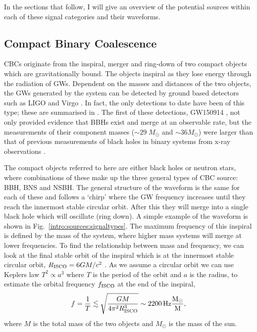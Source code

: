In the sections that follow, I will give an overview of the potential sources
within each of these signal categories and their waveforms.


\subsection{\label{intro:sources:cbc}Compact Binary Coalescence}

\glspl{CBC} originate from the inspiral, merger and ring-down of two compact
objects which are gravitationally bound.  The objects inspiral as they lose
energy through the radiation of \glspl{GW}.  Dependent on the masses
and distances of the two objects, the \glspl{GW} generated by the
system can be detected by ground based detectors such as \gls{LIGO}
\citep{aasi2015AdvancedLIGO} and Virgo \citep{acernese2015AdvancedVirgo}.  In
fact, the only detections to date have been of this type; these are summarised
in
\citep{ligoscientificcollaborationandvirgocollaboration2019GWTC1GravitationalWave}.
The first of these detections, GW150914
\citep{abbott2016ObservationGravitational}, not only provided evidence that
\glspl{BBH} exist and merge at an observable rate, but the measurements of
their component masses ($\sim 29\; M_{\odot}$ and $\sim 36 M_{\odot}$) were
larger than that of previous measurements of black holes in binary systems from
x-ray observations \citep{abbott2016ASTROPHYSICALIMPLICATIONS}. 

The compact objects referred to here are either black holes or neutron stars,
where combinations of these make up the three general types of \gls{CBC}
source: \gls{BBH}, \gls{BNS} and \gls{NSBH}.  The general structure of the
waveform is the same for each of these and follows a `chirp' where the \gls{GW}
frequency increases until they reach the innermost stable circular orbit.
After this they will merge into a single black hole which will oscillate (ring down). A simple example of the waveform is shown in
Fig.~\ref{intro:sources:signaltypes}.  The maximum frequency of this inspiral
is defined by the mass of the system, where higher mass systems will merge at
lower frequencies.  To find the relationship between mass and frequency, we can
look at the final stable orbit of the inspiral which is at the innermost stable
circular orbit, $R_{\rm{ISCO}} = 6GM/c^2$ \citep{maggioreGravitationalWaves}.
As we assume a circular orbit we can use Keplers law $T^2 \propto a^3$ where
$T$ is the period of the orbit and $a$ is the radius, to estimate the orbital
frequency $f_{\rm{ISCO}}$ at the end of the inspiral,
%
\begin{equation}
\label{intro:sources:cbc:freq}
    f = \frac{1}{T} \lesssim \sqrt{\frac{GM}{4 \pi^2 R_{\rm{ISCO}}^3}} \sim 2200 \, \rm{Hz} \frac{M_{\odot}}{M},
\end{equation}
where $M$ is the total mass of the two objects and $M_{\odot}$ is the mass of the sun.

